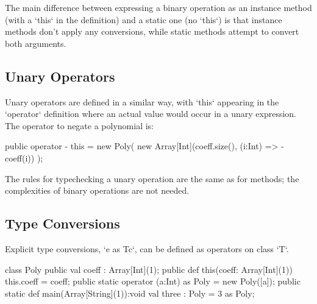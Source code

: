 The main difference between expressing a binary operation as an instance
method (with a \xcd`this` in the definition) and a static one (no \xcd`this`)
is that instance methods don't apply any conversions, while static methods
attempt to convert both arguments. 


\subsection{Unary Operators}

Unary operators are defined in a similar way, with \xcd`this` appearing in the
\xcd`operator` definition where an actual value would occur in a unary
expression.  The operator to negate a polynomial is: 

\begin{xten}
  public operator - this = new Poly(
    new Array[Int](coeff.size(), (i:Int) => -coeff(i))
    );
\end{xten}

The rules for typechecking a unary operation are the same as for methods; the
complexities of binary operations are not needed.



\subsection{Type Conversions}

Explicit type conversions, \xcd`e as T{c}`, can be defined as operators on
class \xcd`T`.

\begin{xten}
class Poly {
  public val coeff : Array[Int](1);
  public def this(coeff: Array[Int](1)) { this.coeff = coeff;}
  public static operator (a:Int) as Poly = new Poly([a]);
  public static def main(Array[String](1)):void {
     val three : Poly = 3 as Poly;
  }
}
\end{xten}
%


